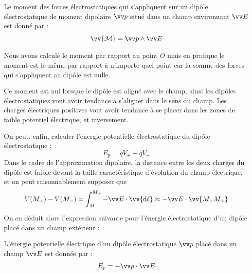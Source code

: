 \documentclass[11pt,fleqn]{book} %
\newcommand{\dd}{\mathrm{d}}
\begin{document}
%
%

\begin{proposition}
    Le moment des forces électrostatiques qui s'appliquent sur un dipôle électrostatique de moment dipolaire $\vv p$ situé dans un champ environnant $\vv E$ est donné par :
\begin{equation}
    \vv{\mathcal{M}} = \vv p \wedge \vv E
\end{equation}
\end{proposition}

\begin{remark}
Nous avons calculé le moment par rapport au point $O$ mais en pratique le moment est le même par rapport à n'importe quel point car la somme des forces qui s'appliquent au dipôle est nulle.
\end{remark}

Ce moment est nul lorsque le dipôle est aligné avec le champ, ainsi les dipôles électrostatiques vont avoir tendance à s'aligner dans le sens du champ. Les charges électriques positives vont avoir tendance à se placer dans les zones de faible potentiel électrique, et inversement. 

On peut, enfin, calculer l'énergie potentielle électrostatique du dipôle électrostatique : 
\begin{equation}
    E_p = q V_+ - q V_-
\end{equation}
Dans le cadre de l'approximation dipolaire, la distance entre les deux charges du dipôle est faible devant la taille caractéristique d'évolution du champ électrique, et on peut raisonnablement supposer que
\begin{equation}
    V(M_+) - V(M_-) = \int_{M_-}^{M_+} - \vv E \cdot \vv{\dd \ell} \approx - \vv E \cdot \vv{M_{-} M_{+}} 
\end{equation}
On en déduit alors l'expression suivante pour l'énergie électrostatique d'un dipôle placé dans un champ extérieur :
\begin{proposition}
    L'énergie potentielle électrique d'un dipôle électrostatique $\vv p$ placé dans un champ $\vv E$ est donnée par :
    \begin{equation}
        E_p = - \vv p \cdot \vv E
    \end{equation}
\end{proposition}
\end{document}
